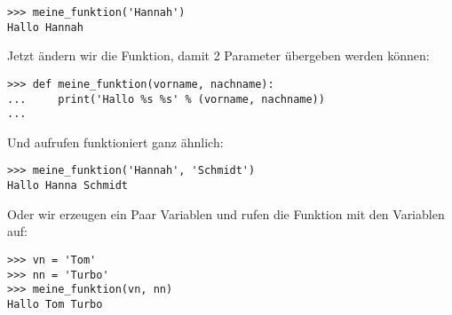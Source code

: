 \begin{Verbatim}[frame=single]
>>> meine_funktion('Hannah')
Hallo Hannah
\end{Verbatim}


\noindent
Jetzt ändern wir die Funktion, damit 2 Parameter übergeben werden können:

\begin{Verbatim}[frame=single]
>>> def meine_funktion(vorname, nachname):
...     print('Hallo %s %s' % (vorname, nachname))
...
\end{Verbatim}

\noindent
Und aufrufen funktioniert ganz ähnlich:

\begin{Verbatim}[frame=single]
>>> meine_funktion('Hannah', 'Schmidt')
Hallo Hanna Schmidt
\end{Verbatim}

\noindent
Oder wir erzeugen ein Paar Variablen und rufen die Funktion mit den Variablen auf:

\begin{Verbatim}[frame=single]
>>> vn = 'Tom'
>>> nn = 'Turbo'
>>> meine_funktion(vn, nn)
Hallo Tom Turbo
\end{Verbatim}

